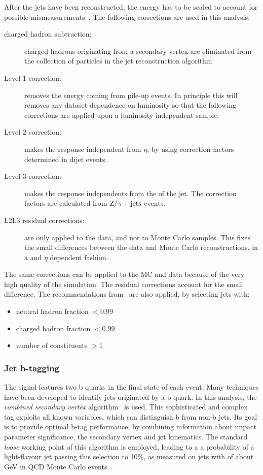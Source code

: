 After the jets have been reconstructed, the energy has to be scaled to
account for possible mismeasurements~\cite{2011JInst...611002C}. The following corrections
are used in this analysis:
\begin{description}
    \item[charged hadron subtraction:] charged hadrons originating from a
        secondary vertex are eliminated from the collection of particles
        in the jet reconstruction algorithm
    \item[Level 1 correction:]removes the energy coming from pile-up
        events. In principle this will removes any dataset dependence on luminosity so that the following corrections are applied upon a luminosity independent sample.
    \item[Level 2 correction:] makes the response independent from
        $\eta$, by using correction factors determined in dijet events.
    \item[Level 3 correction:] makes the response independents from the \pt
        of the jet. The correction factors are calculated from $\mathrm{Z}/\gamma +
        \text{jets}$ events.
    \item[L2L3 residual corrections:] are only applied to the data, and not
        to Monte Carlo samples. This fixes the small differences between the
        data and Monte Carlo reconstructions, in a \pt and $\eta$ dependent
        fashion.
\end{description}
The same corrections can be applied to the MC and data because of the very
high quality of the simulation. The residual corrections account for the
small difference.
The recommendations from~\cite{an:jetid} are also applied, by selecting jets
with:
\begin{itemize}
    \item neutral hadron fraction $< 0.99$
    \item charged hadron fraction $< 0.99$
    \item number of constituents $> 1$
\end{itemize}

\subsubsection{Jet b-tagging}\label{sec:btagging}
The signal features two b quarks in the final state of each event. Many
techniques have been developed to identify jets originated by a b quark. In
this analysis, the \emph{combined secondary
vertex} algorithm~\cite{CMS-PAS-BTV-09-001} is used. This sophisticated and complex tag exploits all known variables, which can distinguish b from non-b jets. Its goal is to provide optimal b-tag performance, by combining information about impact parameter significance, the secondary vertex and jet kinematics.
The standard \emph{loose} working point of this algorithm is employed, leading to a
a probability of a light-flavour jet passing this selection to 10\%,
as measured on jets with \pt of about \unit[80]{GeV} in QCD Monte Carlo
events~\cite{CMS-PAS-BTV-11-001}.

